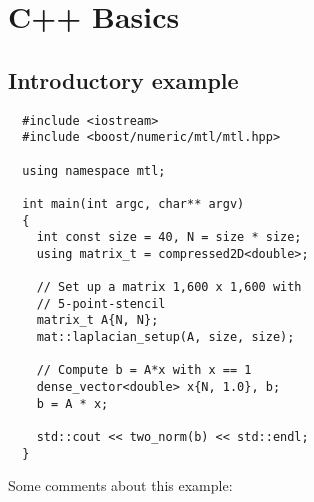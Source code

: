 \chapter{C++ Basics\label{sec:basics}}
\section{Introductory example\label{sec:introductory-example}}

\begin{verbatim}
  #include <iostream>
  #include <boost/numeric/mtl/mtl.hpp>

  using namespace mtl;

  int main(int argc, char** argv)
  {
    int const size = 40, N = size * size;
    using matrix_t = compressed2D<double>;

    // Set up a matrix 1,600 x 1,600 with
    // 5-point-stencil
    matrix_t A{N, N};
    mat::laplacian_setup(A, size, size);

    // Compute b = A*x with x == 1
    dense_vector<double> x{N, 1.0}, b;
    b = A * x;

    std::cout << two_norm(b) << std::endl;
  }
\end{verbatim}

Some comments about this example:


